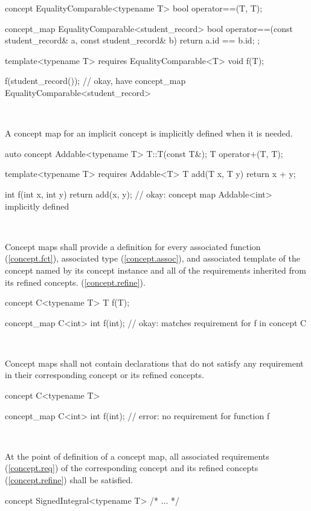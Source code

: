 \documentclass[american]{book}
\begin{document}
\begin{paras}
\begin{codeblock}
concept EqualityComparable<typename T> {
  bool operator==(T, T);
}

concept_map EqualityComparable<student_record> {
  bool operator==(const student_record& a, const student_record& b) { 
    return a.id == b.id; 
  }
}; 

template<typename T> requires EqualityComparable<T> void f(T);

f(student_record()); // okay, have concept_map EqualityComparable<student_record>
\end{codeblock}
\exitexample\

\pnum
A concept map for an implicit concept is implicitly defined when it is
needed.  \enterexample\
\begin{codeblock}
auto concept Addable<typename T> {
  T::T(const T&);
  T operator+(T, T);
}

template<typename T>
requires Addable<T>
T add(T x, T y) {
  return x + y;
}

int f(int x, int y) {
  return add(x, y); // okay: concept map Addable<int> implicitly defined
}
\end{codeblock}
\exitexample\

\pnum
Concept maps shall provide
a definition for every associated function (\ref{concept.fct}),
associated type (\ref{concept.assoc}), and associated template of the
concept named by
its concept instance and
all of the requirements inherited from its refined concepts.
(\ref{concept.refine}). \enterexample\ 
\begin{codeblock}
concept C<typename T> { T f(T); }

concept_map C<int> {
  int f(int); // okay: matches requirement for f in concept C
}
\end{codeblock}
\exitexample\

\pnum
Concept maps shall not contain declarations that do not satisfy any
requirement in their corresponding concept or its refined
concepts. \enterexample\
\begin{codeblock}
concept C<typename T> { }

concept_map C<int> {
  int f(int); // error: no requirement for function f
}
\end{codeblock}
\exitexample\

\pnum 
At the point of definition of a concept map, all associated
requirements (\ref{concept.req}) of the corresponding
concept and its refined concepts (\ref{concept.refine}) shall be
satisfied. \enterexample\
\begin{codeblock}
concept SignedIntegral<typename T> { /* ... */ }


\end{codeblock}
\end{paras}
\end{document}
